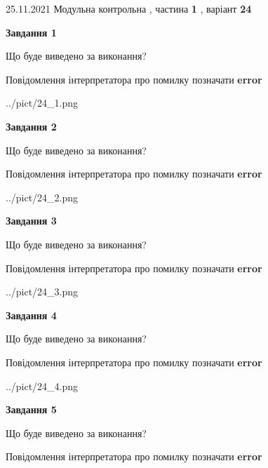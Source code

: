 \documentclass[10pt, ukrainian]{article}
\begin{document}
{25.11.2021 Модульна контрольна , частина \textbf { 1 }, варіант  \No \textbf { 24 }\par}
{
\begin {large}

{\begin {center}\textbf{Завдання 1}\end {center}}\par
Що буде виведено за виконання? \par
Повідомлення інтерпретатора про помилку позначати \textbf{error}

\begin{center}
	{../pict/24_1.png}
\end{center}
\newpage

{\begin {center}\textbf{Завдання 2}\end {center}}\par
Що буде виведено за виконання? \par
Повідомлення інтерпретатора про помилку позначати \textbf{error}

\begin{center}
	{../pict/24_2.png}
\end{center}
\newpage

{\begin {center}\textbf{Завдання 3}\end {center}}\par
Що буде виведено за виконання? \par
Повідомлення інтерпретатора про помилку позначати \textbf{error}

\begin{center}
	{../pict/24_3.png}
\end{center}
\newpage

{\begin {center}\textbf{Завдання 4}\end {center}}\par
Що буде виведено за виконання? \par
Повідомлення інтерпретатора про помилку позначати \textbf{error}

\begin{center}
	{../pict/24_4.png}
\end{center}
\newpage

{\begin {center}\textbf{Завдання 5}\end {center}}\par
Що буде виведено за виконання? \par
Повідомлення інтерпретатора про помилку позначати \textbf{error}


\end{large}}
\end{document}
